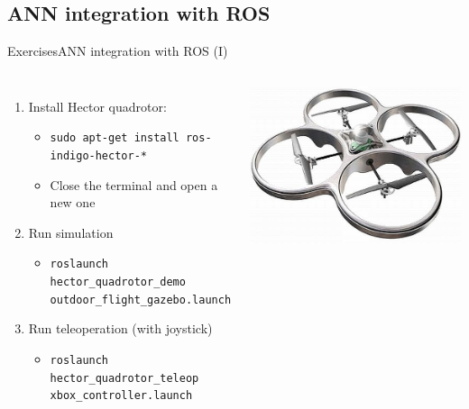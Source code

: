 \documentclass[10pt,compress]{beamer} %
\begin{document}
\subsection{ANN integration with ROS}
\begin{frame}{Exercises}{ANN integration with ROS (I)}
	\begin{columns}
	\begin{enumerate}
		\item Install Hector quadrotor: 
			\begin{itemize}
			\item \texttt{sudo apt-get install ros-indigo-hector-*}
			\item Close the terminal and open a new one
			\end{itemize}
		\item Run simulation
			\begin{itemize}
			\item \texttt{roslaunch hector\_quadrotor\_demo outdoor\_flight\_gazebo.launch}
			\end{itemize}
		\item Run teleoperation (with joystick)
			\begin{itemize}
			\item \texttt{roslaunch hector\_quadrotor\_teleop xbox\_controller.launch}
			\end{itemize}
	\end{enumerate}
		\centering\includegraphics[width=\linewidth]{figs/quad.jpg}
	\end{columns}
\end{frame}
\end{document}
